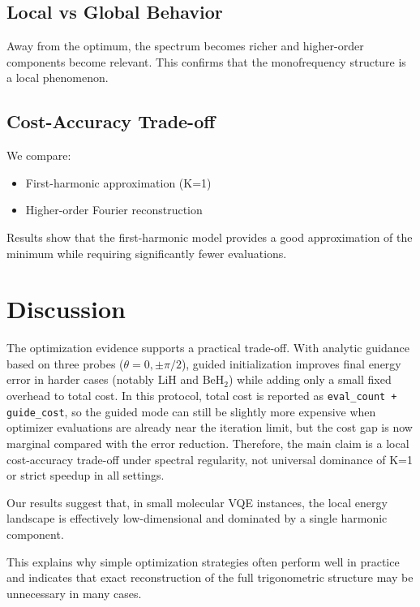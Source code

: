 \documentclass[12pt]{article}
\begin{document}
\subsection{Local vs Global Behavior}

Away from the optimum, the spectrum becomes richer and higher-order components become relevant. This confirms that the monofrequency structure is a local phenomenon.

\subsection{Cost-Accuracy Trade-off}

We compare:
\begin{itemize}
    \item First-harmonic approximation (K=1)
    \item Higher-order Fourier reconstruction
\end{itemize}

Results show that the first-harmonic model provides a good approximation of the minimum while requiring significantly fewer evaluations.


\section{Discussion}

The optimization evidence supports a practical trade-off. With analytic guidance based on three probes ($\theta = 0, \pm\pi/2$), guided initialization improves final energy error in harder cases (notably LiH and BeH$_2$) while adding only a small fixed overhead to total cost. In this protocol, total cost is reported as \texttt{eval\_count + guide\_cost}, so the guided mode can still be slightly more expensive when optimizer evaluations are already near the iteration limit, but the cost gap is now marginal compared with the error reduction. Therefore, the main claim is a local cost-accuracy trade-off under spectral regularity, not universal dominance of K=1 or strict speedup in all settings.

Our results suggest that, in small molecular VQE instances, the local energy landscape is effectively low-dimensional and dominated by a single harmonic component.

This explains why simple optimization strategies often perform well in practice and indicates that exact reconstruction of the full trigonometric structure may be unnecessary in many cases.
\end{document}
